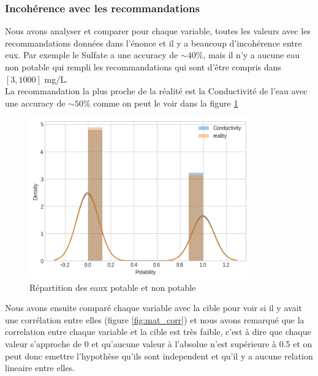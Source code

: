\documentclass[12pt, a4paper]{article}
\begin{document}
    \subsubsection{Incohérence avec les recommandations}
    Nous avons analyser et comparer pour chaque variable, toutes les valeurs avec les recommandations données dans l'énonce et il y a beaucoup d'incohérence entre eux. Par exemple le Sulfate a une accuracy de $\sim 40\%$, mais il n'y a aucune eau non potable qui rempli les recommandations qui sont d'être compris dans $[3, 1000]$ mg/L.\\
    
    La recommandation la plus proche de la réalité est la Conductivité de l'eau avec une accuracy de $\sim 50\%$ comme on peut le voir dans la figure \ref{fig:conductivite_hist}
    
    \begin{figure}[H]
           \centering
           \includegraphics[width=9.5cm]{images/output_42_1.png}
           \caption{Répartition des eaux potable et non potable}
            \label{fig:conductivite_hist}
    \end{figure}
    
    Nous avons ensuite comparé chaque variable avec la cible pour voir si il y avait une corrélation entre elles (figure \ref{fig:mat_corr}) et nous avons remarqué que la correlation entre chaque variable et la cible est très faible, c'est à dire que chaque valeur s'approche de 0 et qu'aucune valeur à l'absolue n'est supérieure à 0.5 et on peut donc emettre l'hypothèse qu'ils sont independent et qu'il y a aucune relation lineaire entre elles.
    
\end{document}
